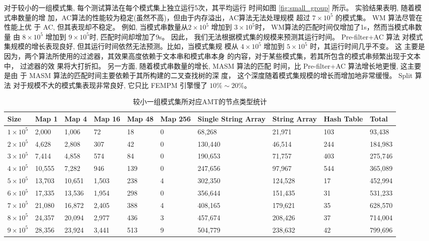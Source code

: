 对于较小的一组模式集, 每个测试算法在每个模式集上独立运行5次，其平均运行
时间如图 \ref{fig:small_group} 所示。 实验结果表明, 随着模式串数量的增
加，AC算法的性能较为稳定(虽然不高)，但由于内存溢出，AC算法无法处理规模
超过 $7 \times 10^5$ 的模式集。 \textsf{WM} 算法尽管在性能上优
于 \textsf{AC}, 但其表现却不稳定。 例如, 当模式串数量从$2 \times 10^5$
增加到 $3 \times 10^5$时， WM算法的匹配时间仅增加了1s，然而当模式串数量
由 $8 \times 10^5$ 增加到 $9 \times 10^5$时, 匹配时间却增加了9s。 因此，
我们无法根据模式集的规模来预测其运行时间。 \textsf{Pre-filter+AC} 算法
对模式集规模的增长表现良好, 但其运行时间依然无法预测。比如，当模式集规
模从 $4 \times 10^5$ 增加到 $5 \times 10^5$ 时，其运行时间几乎不变。 这
主要是因为，两个算法所使用的过滤器，其效果高度依赖于文本串和模式串本身
的内容，对于某些模式集，若其所包含的模式串频繁出现于文本中， 过滤器的效
果将大打折扣。 另一方面, 随着模式串数量的增长, \textsf{MASM} 算法的匹配
时间，比 \textsf{Pre-filter+AC} 算法增长地更慢, 这主要是由
于 \textsf{MASM} 算法的匹配时间主要依赖于其所构建的二叉查找树的深
度， 这个深度随着模式集规模的增长而增加地非常缓慢。 \textsf{Split} 算法
对于规模不大的模式集表现非常良好, 它只比 \textsf{FEMPM} 引擎慢了 $10\%
\sim 20\%$。


\begin{table}[!htp]
  \scriptsize
  \caption{较小一组模式集所对应AMT的节点类型统计}
  \label{tab:small}
  \begin{tabular}{p{25pt}p{25pt}p{25pt}p{25pt}p{15pt}p{15pt}p{25pt}p{25pt}p{20pt}p{25pt}}
 \hline
 Size &
 Map 1 &
 Map 4 &
 Map 16 &
 Map 48 &
 Map 256 &
 Single String Array &
 String Array   &
 Hash Table &
 Total\\
\hline
$1 \times 10^5$ &  2,000 &  1,006 &    72 &  18 & 0 &  68,268 &  21,971 & 103 &  93,438 \\
$2 \times 10^5$ &  4,628 &  2,808 &   307 &  42 & 0 & 130,440 &  46,514 & 244 & 184,983 \\
$3 \times 10^5$ &  7,414 &  4,858 &   574 &  84 & 0 & 190,653 &  71,757 & 403 & 275,746 \\
$4 \times 10^5$ & 10,555 &  7,282 &   946 & 139 & 0 & 247,656 &  97,967 & 544 & 365,089 \\
$5 \times 10^5$ & 13,703 & 10,651 & 1,503 & 238 & 4 & 302,350 & 124,528 &  17 & 452,994 \\
$6 \times 10^5$ & 17,335 & 13,536 & 1,954 & 298 & 0 & 356,644 & 151,435 &  31 & 531,233 \\
$7 \times 10^5$ & 21,080 & 16,872 & 2,405 & 388 & 4 & 408,165 & 179,621 &  35 & 628,570 \\
$8 \times 10^5$ & 24,357 & 20,094 & 2,977 & 436 & 3 & 457,674 & 208,426 &  37 & 714,004 \\
$9 \times 10^5$ & 28,356 & 23,924 & 3,441 & 513 & 9 & 504,779 & 238,632 &  42 & 799,696 \\
\hline
  \end{tabular}
\end{table}

